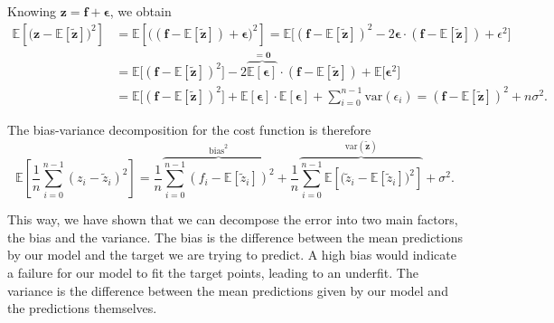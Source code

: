 \documentclass[10pt, a4paper]{article}
\begin{document}
    Knowing \(\bm{z}=\bm{f} + \bm{\epsilon}\), we obtain
    \begin{align*}
        \mathbb{E}\left[\big(\bm{z} - \mathbb{E}[\bm{\widetilde{z}}]\big)^2\right] &= \mathbb{E}\left[\big((\bm{f} - \mathbb{E}[\bm{\widetilde{z}}]) + \bm{\epsilon}\big)^2\right] = \mathbb{E}\big[(\bm{f} - \mathbb{E}[\bm{\widetilde{z}}])^2 - 2\bm{\epsilon}\cdot(\bm{f} - \mathbb{E}[\bm{\widetilde{z}}]) + \epsilon^2\big]
        \\
        &= \mathbb{E}\big[(\bm{f} - \mathbb{E}[\bm{\widetilde{z}}])^2\big] - 2\overbrace{\mathbb{E}[\bm{\epsilon}]}^{ = \bm{0}}\cdot(\bm{f} - \mathbb{E}[\bm{\widetilde{z}}]) + \mathbb{E}\big[\bm{\epsilon}^2\big] 
        \\
        &= \mathbb{E}\big[(\bm{f} - \mathbb{E}[\bm{\widetilde{z}}])^2\big] + \mathbb{E}[\bm{\epsilon}]\cdot\mathbb{E}[\bm{\epsilon}] + \sum_{i=0}^{n-1}\text{var}(\epsilon_i) = (\bm{f} - \mathbb{E}[\bm{\widetilde{z}}])^2 + n\sigma^2.
    \end{align*}
    
    The bias-variance decomposition for the cost function is therefore
    \begin{equation}
        \mathbb{E}\left[\frac{1}{n}\sum_{i=0}^{n-1}(z_i - \widetilde{z}_i)^2\right] = \frac{1}{n}\overbrace{\sum_{i=0}^{n-1}(f_i - \mathbb{E}[\widetilde{z}_i])^2}^{\text{bias}^2} + \frac{1}{n}\overbrace{\sum_{i=0}^{n-1}\mathbb{E}\left[\big(\widetilde{z}_i - \mathbb{E}[\widetilde{z}_i]\big)^2\right]}^{\text{var}(\bm{\widetilde{z}})} + \sigma^2.
    \end{equation}

    This way, we have shown that we can decompose the error into two main factors, the bias and the variance. The bias is the difference between the mean predictions by our model and the target we are trying to predict. A high bias would indicate a failure for our model to fit the target points, leading to an underfit. The variance is the difference between the mean predictions given by our model and the predictions themselves.
    
\end{document}
